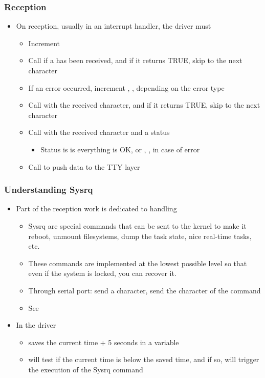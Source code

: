 \begin{frame}
  \frametitle{Reception}
  \begin{itemize}
  \item On reception, usually in an interrupt handler, the driver must
    \begin{itemize}
    \item Increment 
    \item Call  if a  has been
      received, and if it returns TRUE, skip to the next character
    \item If an error occurred, increment ,
      ,  depending
      on the error type
    \item Call  with the received
      character, and if it returns TRUE, skip to the next character
    \item Call  with the received character
      and a status
      \begin{itemize}
      \item Status is  is everything is OK, or
        , ,  in case
        of error
      \end{itemize}
    \item Call  to push data to the TTY
      layer
    \end{itemize}
  \end{itemize}
\end{frame}

\begin{frame}
  \frametitle{Understanding Sysrq}
  \begin{itemize}
  \item Part of the reception work is dedicated to handling
    \begin{itemize}
    \item Sysrq are special commands that can be sent to the kernel to
      make it reboot, unmount filesystems, dump the task state, nice
      real-time tasks, etc.
    \item These commands are implemented at the lowest possible level
      so that even if the system is locked, you can recover it.
    \item Through serial port: send a  character, send the
      character of the  command
    \item See 
    \end{itemize}
  \item In the driver
    \begin{itemize}
    \item {} saves the current time + 5
      seconds in a variable
    \item {} will test if the current
      time is below the saved time, and if so, will trigger the
      execution of the Sysrq command
    \end{itemize}
  \end{itemize}
\end{frame}


